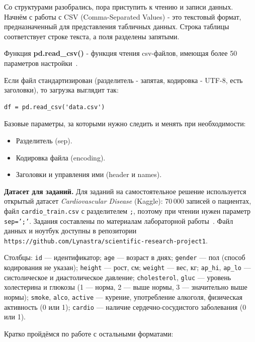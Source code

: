 \documentclass[pract]{SCWorks}
\begin{document}
Со структурами разобрались, пора приступить к чтению и записи данных. Начнём с работы с CSV 
(Comma-Separated Values) - это текстовый формат, предназначенный для представления табличных данных. Строка таблицы 
соответствует строке текста, а поля разделены запятыми.

Функция \textbf{pd.read\_csv()} - функция чтения csv-файлов, имеющая более 50 параметров настройки~\cite{pandas-docs}.

Если файл стандартизирован (разделитель - запятая, кодировка - UTF-8, есть заголовки), то загрузка выглядит так:

\begin{verbatim}
df = pd.read_csv('data.csv')
\end{verbatim}

Базовые параметры, за которыми нужно следить и менять при необходимости:

\begin{itemize}
    \item Разделитель (sep).
    \item Кодировка файла (encoding).
    \item Заголовки и управления ими (header и names).
\end{itemize}

\medskip
\noindent\textbf{Датасет для заданий.} Для заданий на самостоятельное решение используется открытый датасет
\textit{Cardiovascular Disease} (Kaggle): 70\,000 записей о пациентах, файл \texttt{cardio\_train.csv} с
разделителем \texttt{;}, поэтому при чтении нужен параметр \texttt{sep=';'}. Задания составлены по материалам
лабораторной работы~\cite{kaggle-eda}. Файл данных и ноутбук доступны в репозитории
\texttt{https://github.com/Lynastra/scientific-research-project1}.

Столбцы: \texttt{id} --- идентификатор; \texttt{age} --- возраст в днях; \texttt{gender} --- пол (способ
кодирования не указан); \texttt{height} --- рост, см; \texttt{weight} --- вес, кг; \texttt{ap\_hi},
\texttt{ap\_lo} --- систолическое и диастолическое давление; \texttt{cholesterol}, \texttt{gluc} --- уровень
холестерина и глюкозы (1 --- норма, 2 --- выше нормы, 3 --- значительно выше нормы); \texttt{smoke},
\texttt{alco}, \texttt{active} --- курение, употребление алкоголя, физическая активность (0 или 1);
\texttt{cardio} --- наличие сердечно-сосудистого заболевания (0 или 1).

Кратко пройдёмся по работе с остальными форматами:
\end{document}
